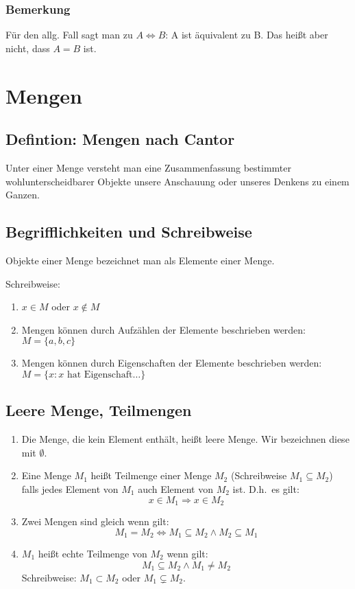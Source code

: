 \subsubsection{Bemerkung}
Für den allg. Fall sagt man zu $A \Leftrightarrow B$: A ist äquivalent
zu B. Das heißt aber nicht, dass $A=B$ ist.


\section{Mengen}
\subsection{Defintion: Mengen nach Cantor}
Unter einer Menge versteht man eine Zusammenfassung
bestimmter wohlunterscheidbarer Objekte unsere Anschauung oder unseres Denkens
zu einem Ganzen.

\subsection{Begrifflichkeiten und Schreibweise}
Objekte einer Menge bezeichnet man als Elemente einer Menge.

Schreibweise:
\begin{enumerate}[label= (\alph*)]
    \item $x \in M$ oder $x \notin M$
    \item Mengen können durch Aufzählen der Elemente beschrieben werden:
        $M= \{ a, b, c \}$
    \item Mengen können durch Eigenschaften der Elemente beschrieben werden:
        $M= \{x: x \text{ hat Eigenschaft\ldots} \}$
\end{enumerate}

\subsection{Leere Menge, Teilmengen}
\begin{enumerate}[label= (\alph*)]
    \item Die Menge, die kein Element enthält, heißt leere Menge.
        Wir bezeichnen diese mit $\emptyset$.
    \item Eine Menge $M_1$ heißt Teilmenge einer Menge $M_2$
        (Schreibweise $M_1 \subseteq M_2$) falls jedes Element von $M_1$ auch
        Element von $M_2$ ist. D.h.\ es gilt:
        \begin{equation*}
            x \in M_1 \Rightarrow x \in M_2
        \end{equation*}
    \item Zwei Mengen sind gleich wenn gilt:
        \begin{equation*}
            M_1 = M_2 \Leftrightarrow M_1 \subseteq M_2 \land M_2 \subseteq M_1
        \end{equation*}
    \item $M_1$ heißt echte Teilmenge von $M_2$ wenn gilt:
        \begin{equation*}
            M_1 \subseteq M_2 \land M_1 \neq M_2
        \end{equation*}
        Schreibweise: $M_1 \subset M_2$ oder $M_1 \subsetneq M_2$.
\end{enumerate}

